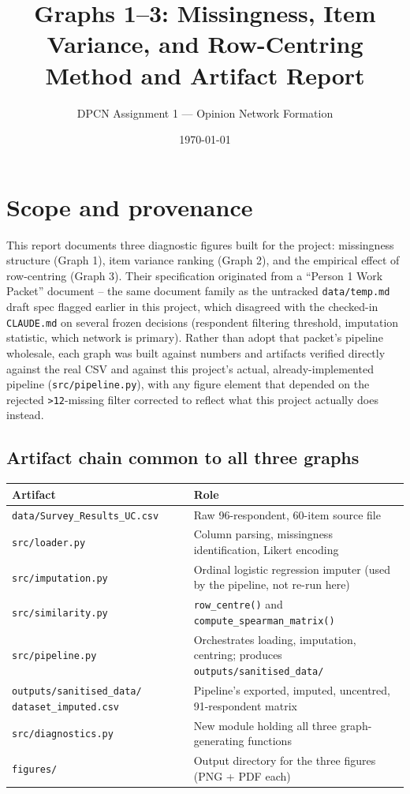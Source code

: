 \documentclass[11pt]{article}
\title{Graphs 1--3: Missingness, Item Variance, and Row-Centring \\
\large Method and Artifact Report}
\author{DPCN Assignment 1 --- Opinion Network Formation}
\date{\today}
\begin{document}
\maketitle
\sloppy

\section{Scope and provenance}

This report documents three diagnostic figures built for the project:
missingness structure (Graph 1), item variance ranking (Graph 2), and the
empirical effect of row-centring (Graph 3). Their specification originated
from a ``Person 1 Work Packet'' document -- the same document family as the
untracked \texttt{data/temp.md} draft spec flagged earlier in this project,
which disagreed with the checked-in \texttt{CLAUDE.md} on several frozen
decisions (respondent filtering threshold, imputation statistic, which
network is primary). Rather than adopt that packet's pipeline wholesale, each
graph was built against numbers and artifacts verified directly against the
real CSV and against this project's actual, already-implemented pipeline
(\texttt{src/pipeline.py}), with any figure element that depended on the
rejected \texttt{>12}-missing filter corrected to reflect what this project
actually does instead.

\subsection{Artifact chain common to all three graphs}

\begin{center}
\begin{tabularx}{\linewidth}{l Y}
\toprule
Artifact & Role \\
\midrule
\texttt{data/Survey\_Results\_UC.csv} & Raw 96-respondent, 60-item source file \\
\texttt{src/loader.py} & Column parsing, missingness identification, Likert encoding \\
\texttt{src/imputation.py} & Ordinal logistic regression imputer (used by the pipeline, not re-run here) \\
\texttt{src/similarity.py} & \texttt{row\_centre()} and \texttt{compute\_spearman\_matrix()} \\
\texttt{src/pipeline.py} & Orchestrates loading, imputation, centring; produces \texttt{outputs/sanitised\_data/} \\
\texttt{outputs/sanitised\_data/} \newline \texttt{dataset\_imputed.csv} & Pipeline's exported, imputed, uncentred, 91-respondent matrix \\
\texttt{src/diagnostics.py} & New module holding all three graph-generating functions \\
\texttt{figures/} & Output directory for the three figures (PNG + PDF each) \\
\bottomrule
\end{tabularx}
\end{center}
\end{document}
